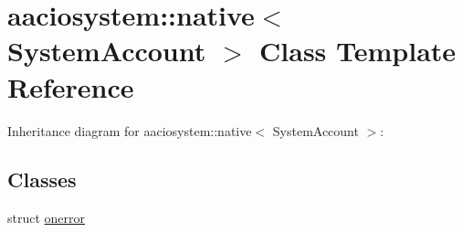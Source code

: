 \hypertarget{classaaciosystem_1_1native}{}\section{aaciosystem\+:\+:native$<$ System\+Account $>$ Class Template Reference}
\label{classaaciosystem_1_1native}


Inheritance diagram for aaciosystem\+:\+:native$<$ System\+Account $>$\+:
\subsection*{Classes}
\begin{DoxyCompactItemize}
\item 
struct \mbox{\hyperlink{structaaciosystem_1_1native_1_1onerror}{onerror}}
\end{DoxyCompactItemize}
